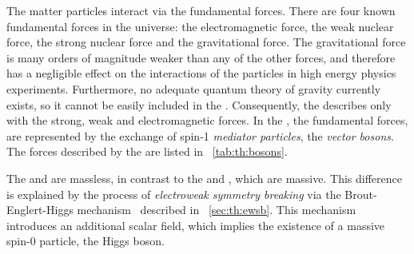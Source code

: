 The matter particles interact via the fundamental forces. There are four known fundamental forces in the universe: the electromagnetic force, the weak nuclear force, the strong nuclear force and the gravitational force. The gravitational force is many orders of magnitude weaker than any of the other forces, and therefore has a negligible effect on the interactions of the \SM particles in high energy physics experiments. Furthermore, no adequate quantum theory of gravity currently exists, so it cannot be easily included in the \SM. Consequently, the \SM describes only with the strong, weak and electromagnetic forces. In the \SM, the fundamental forces, are represented by the exchange of spin-1 \emph{mediator particles}, the \emph{vector bosons}. 
The forces described by the \SM are listed in \Tab~\ref{tab:th:bosons}.

\begin{table}[h!]
 \caption{The three fundamental forces described by the SM. 
 The mediator particle of each force is indicated along with its measured mass, where the uncertainties have been omitted. \cite{Thomson:2013zua,PDGBooklet}}
\label{tab:th:bosons}
  \end{table}

The \Pphoton and \Pgluon are massless, in contrast to the \PWpm and \PZ, which are massive. This difference is explained by the process of \emph{electroweak symmetry breaking} via the Brout-Englert-Higgs mechanism~\cite{Englert:1964et,Higgs:1964ia,Higgs:1964pj,Guralnik:1964eu,Higgs:1966ev,Kibble:1967sv} described in \Sec~\ref{sec:th:ewsb}. This mechanism introduces an additional scalar field, which implies the existence of a massive spin-$0$ particle, the Higgs boson.

